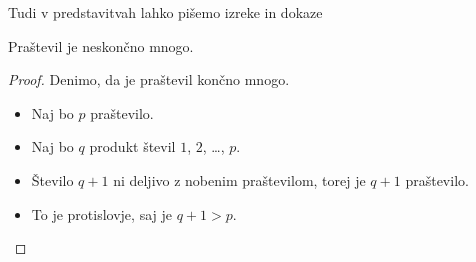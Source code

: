 \begin{frame}{Tudi v predstavitvah lahko pišemo izreke in dokaze}

	\begin{izrek}
	   Praštevil je neskončno mnogo.
	\end{izrek}
	\begin{proof}
	   Denimo, da je praštevil končno mnogo.
	   \begin{itemize}[<+->]
		  \item Naj bo $p$ \textit{} praštevilo.
		  \item Naj bo $q$ produkt števil $1$, $2$, \ldots, $p$.
		  \item Število $q+1$ ni deljivo z nobenim praštevilom, torej je $q+1$ praštevilo.
		  \item To je protislovje, saj je $q+1>p$. \qedhere
	   \end{itemize}
	\end{proof}
 \end{frame}
 
